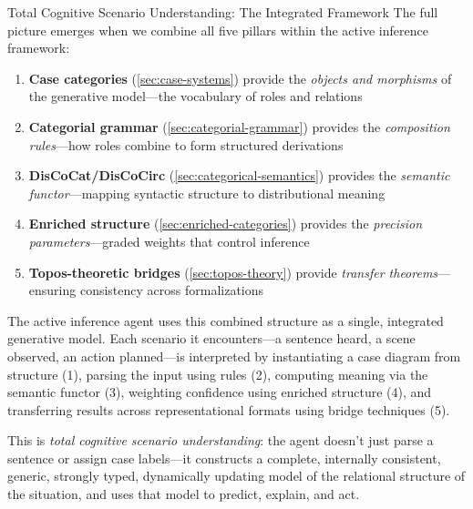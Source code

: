 \documentclass[
  ignorenonframetext,
]{beamer}
\providecommand{\tightlist}{%
  \setlength{\itemsep}{0pt}\setlength{\parskip}{0pt}}
\begin{document}
\begin{frame}{Total Cognitive Scenario Understanding: The Integrated
Framework}
\protect{}\label{total-cognitive-scenario-understanding-the-integrated-framework}
The full picture emerges when we combine all five pillars within the
active inference framework:

\begin{enumerate}
\tightlist
\item
  \textbf{Case categories} (\autoref{sec:case-systems}) provide the
  \emph{objects and morphisms} of the generative model---the vocabulary
  of roles and relations
\item
  \textbf{Categorial grammar} (\autoref{sec:categorial-grammar})
  provides the \emph{composition rules}---how roles combine to form
  structured derivations
\item
  \textbf{DisCoCat/DisCoCirc} (\autoref{sec:categorical-semantics})
  provides the \emph{semantic functor}---mapping syntactic structure to
  distributional meaning
\item
  \textbf{Enriched structure} (\autoref{sec:enriched-categories})
  provides the \emph{precision parameters}---graded weights that control
  inference
\item
  \textbf{Topos-theoretic bridges} (\autoref{sec:topos-theory}) provide
  \emph{transfer theorems}---ensuring consistency across formalizations
\end{enumerate}

The active inference agent uses this combined structure as a single,
integrated generative model. Each scenario it encounters---a sentence
heard, a scene observed, an action planned---is interpreted by
instantiating a case diagram from structure (1), parsing the input using
rules (2), computing meaning via the semantic functor (3), weighting
confidence using enriched structure (4), and transferring results across
representational formats using bridge techniques (5).

This is \emph{total cognitive scenario understanding}: the agent doesn't
just parse a sentence or assign case labels---it constructs a complete,
internally consistent, generic, strongly typed, dynamically updating
model of the relational structure of the situation, and uses that model
to predict, explain, and act.
\end{frame}
\end{document}
